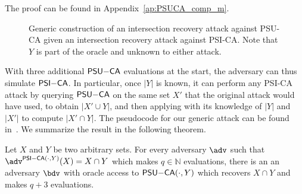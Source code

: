 The proof can be found in Appendix~\ref{ap:PSUCA_comp_m}.


\begin{figure*}
	\centering
	\begin{pchstack}
		\pchspace
	\end{pchstack}
	\caption{Generic construction of an intersection recovery attack \bdv{} against PSU-CA given an intersection recovery attack \adv{} against PSI-CA. 
	Note that $Y$ is part of the oracle and unknown to either attack.}
	\label{fig:PSUCA_generic}
\end{figure*}

With three additional $\mathsf{PSU\relax{-}CA}$ evaluations at the start, the adversary can thus simulate $\mathsf{PSI\relax{-}CA}$. In particular, once $|Y|$ is known, it can perform any PSI-CA attack by querying $\mathsf{PSU\relax{-}CA}$ on the same set $X'$ that the original attack would have used, to obtain $|X'\cup Y|$, and then applying  with its knowledge of $|Y|$ and $|X'|$ to compute $|X'\cap Y|$. The pseudocode for our generic attack can be found in~. We summarize the result in the following theorem.

\begin{theorem}\label{thm:psica-to-psuca}
	Let $X$ and $Y$ be two arbitrary sets.
	For every adversary $\adv$ such that $\adv^{\PSICA(\cdot, Y)}(X) = X \cap Y$ which makes $q\in\mathbb{N}$ \PSICA{} evaluations,
	there is an an adversary $\bdv$ with oracle access to $\mathsf{PSU\relax{-}CA}(\cdot, Y)$ which recovers $X \cap Y$ and makes $q + 3$ \PSUCA{} evaluations. 
\end{theorem}

